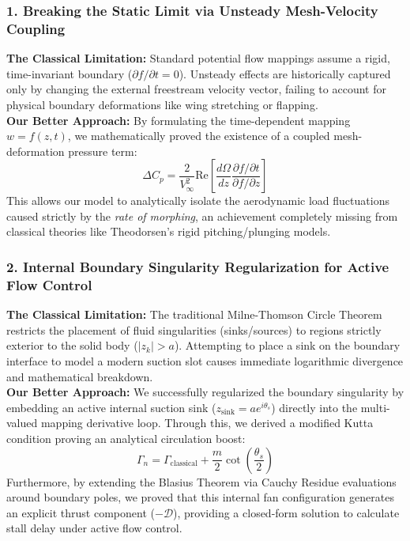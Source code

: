 \documentclass[12pt,a4paper]{article}
\begin{document}
\subsubsection{1. Breaking the Static Limit via Unsteady Mesh-Velocity Coupling}
\textbf{The Classical Limitation:} Standard potential flow mappings assume a rigid, time-invariant boundary ($\partial f / \partial t = 0$). Unsteady effects are historically captured only by changing the external freestream velocity vector, failing to account for physical boundary deformations like wing stretching or flapping. \\
\textbf{Our Better Approach:} By formulating the time-dependent mapping $w = f(z,t)$, we mathematically proved the existence of a coupled mesh-deformation pressure term:
\begin{equation}
    \Delta C_p = \frac{2}{V_\infty^2} \text{Re} \left[ \frac{d\Omega}{dz} \frac{\partial f / \partial t}{\partial f / \partial z} \right]
\end{equation}
This allows our model to analytically isolate the aerodynamic load fluctuations caused strictly by the \textit{rate of morphing}, an achievement completely missing from classical theories like Theodorsen's rigid pitching/plunging models.

\subsubsection{2. Internal Boundary Singularity Regularization for Active Flow Control}
\textbf{The Classical Limitation:} The traditional Milne-Thomson Circle Theorem restricts the placement of fluid singularities (sinks/sources) to regions strictly exterior to the solid body ($|z_k| > a$). Attempting to place a sink on the boundary interface to model a modern suction slot causes immediate logarithmic divergence and mathematical breakdown. \\
\textbf{Our Better Approach:} We successfully regularized the boundary singularity by embedding an active internal suction sink ($z_{\text{sink}} = a e^{i\theta_s}$) directly into the multi-valued mapping derivative loop. Through this, we derived a modified Kutta condition proving an analytical circulation boost:
\begin{equation}
    \Gamma_n = \Gamma_{\text{classical}} + \frac{m}{2} \cot\left(\frac{\theta_s}{2}\right)
\end{equation}
Furthermore, by extending the Blasius Theorem via Cauchy Residue evaluations around boundary poles, we proved that this internal fan configuration generates an explicit thrust component ($-\mathcal{D}$), providing a closed-form solution to calculate stall delay under active flow control.
\end{document}
